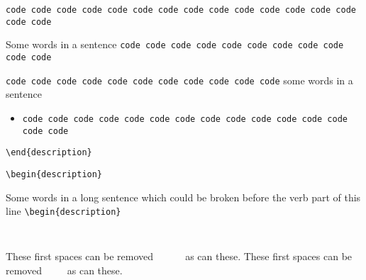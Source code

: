 


\verb|code code code code code code code code code code code code code code code code|


Some words in a sentence \verb|code code code code code code code code code code code|

\verb|code code code code code code code code code code code| some words in a sentence


\begin{itemize}
  \item
    \verb|code code code code code code code code code code code code code code code|
\end{itemize}


\verb|\end{description}|

\verb|\begin{description}|


Some words in a long sentence which could be broken before the verb part of this line \verb|\begin{description}|


\verb|     |

These first spaces can    be removed    \verb|     |     as can     these.
These first spaces can    be removed\verb|     |as can     these.


